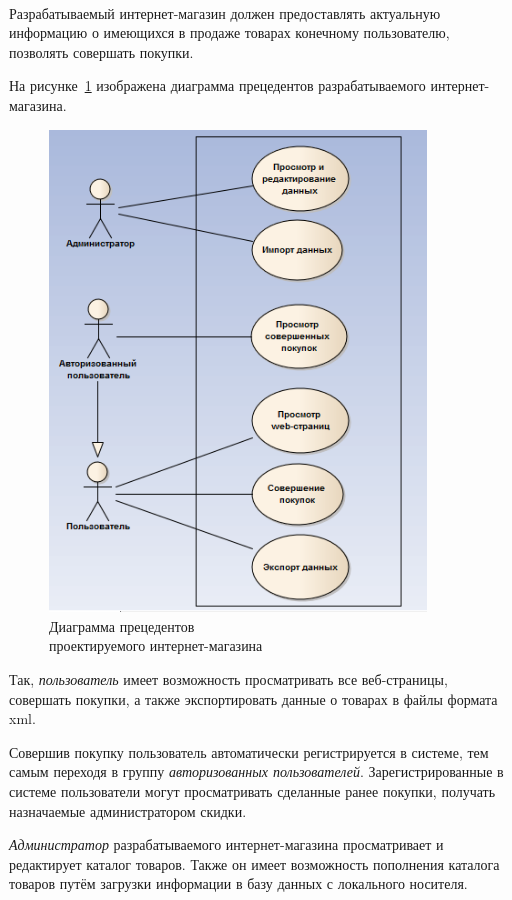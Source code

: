 \paragraph{}
Разрабатываемый интернет-магазин должен предоставлять актуальную информацию о
имеющихся в продаже товарах конечному пользователю, позволять совершать покупки.

На рисунке~\ref{fig:use_case} изображена диаграмма прецедентов
разрабатываемого интернет-магазина.

\begin{figure}[h]
  \centering
  \includegraphics[width=100mm]{pic/use_case.png}
  \caption{Диаграмма прецедентов \\ проектируемого интернет-магазина}
  \label{fig:use_case}
\end{figure}

Так, \textit{пользователь} имеет возможность просматривать все веб-страницы,
совершать покупки, а также экспортировать данные о товарах в файлы формата xml.

Совершив покупку пользователь автоматически регистрируется в системе,
тем самым переходя в группу \textit{авторизованных пользователей}.
Зарегистрированные в системе пользователи могут просматривать сделанные ранее покупки,
получать назначаемые администратором скидки.

\textit{Администратор} разрабатываемого интернет-магазина просматривает
и редактирует каталог товаров. Также он имеет возможность
пополнения каталога товаров путём загрузки информации в базу данных с
локального носителя.

